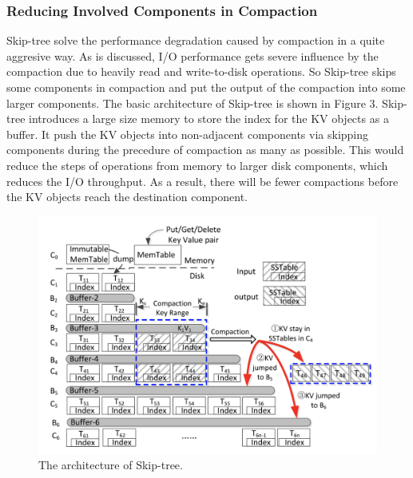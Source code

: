 \documentclass[a4paper,10pt,twoside]{article}
\begin{document}
\subsubsection{Reducing Involved Components in Compaction}
Skip-tree \cite{7569086} solve the performance degradation caused by compaction in a quite aggresive way.
As is discussed, I/O performance gets severe influence by the compaction due to heavily read and write-to-disk operations.
So Skip-tree skips some components in compaction and put the output of the compaction into some larger components.
The basic architecture of Skip-tree is shown in Figure 3.
Skip-tree introduces a large size memory to store the index for the KV objects as a buffer.
It push the KV objects into non-adjacent components via skipping components during the precedure of compaction as many as possible.
This would reduce the steps of operations from memory to larger disk components, which reduces the I/O throughput.
As a result, there will be fewer compactions before the KV objects reach the destination component.
\begin{figure}[h]
    \centering
	\includegraphics[scale=0.3]{Skip-tree.png}
    \caption{ The architecture of Skip-tree.}
    \label{fig:mesh1}
\end{figure}
\end{document}
